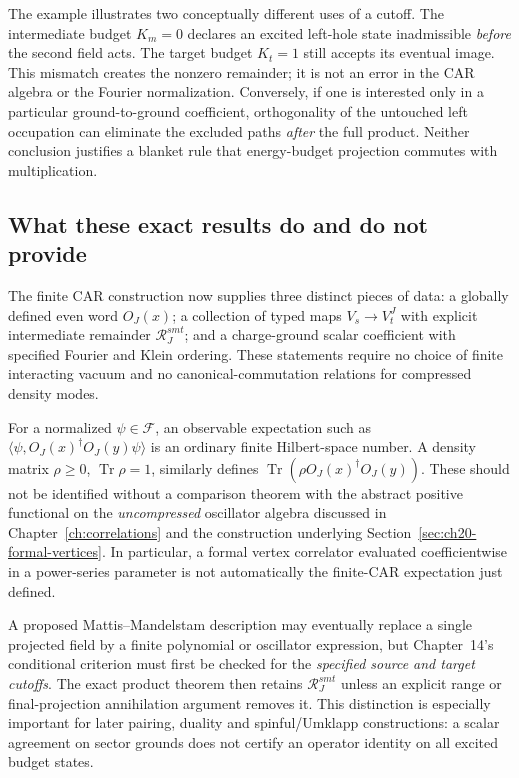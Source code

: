 The example illustrates two conceptually different uses of a cutoff.
The intermediate budget \(K_m=0\) declares an excited left-hole state
inadmissible \emph{before} the second field acts.  The target budget
\(K_t=1\) still accepts its eventual image.  This mismatch creates the
nonzero remainder; it is not an error in the CAR algebra or the Fourier
normalization.  Conversely, if one is interested only in a particular
ground-to-ground coefficient, orthogonality of the untouched left
occupation can eliminate the excluded paths \emph{after} the full
product.  Neither conclusion justifies a blanket rule that energy-budget
projection commutes with multiplication.

\subsection{What these exact results do and do not provide}
\label{subsec:ch20-scope}

The finite CAR construction now supplies three distinct pieces of data:
a globally defined even word \(O_J(x)\); a collection of typed maps
\(V_s\to V_t^J\) with explicit intermediate remainder
\(\mathcal R_J^{smt}\); and a charge-ground scalar coefficient with
specified Fourier and Klein ordering.  These statements require no
choice of finite interacting vacuum and no canonical-commutation
relations for compressed density modes.

For a normalized \(\psi\in\mathcal F\), an observable expectation such
as \(\langle\psi,O_J(x)^{\dagger}O_J(y)\psi\rangle\) is an ordinary
finite Hilbert-space number.  A density matrix \(\rho\geq0\),
\(\operatorname{Tr}\rho=1\), similarly defines
\(\operatorname{Tr}(\rho O_J(x)^{\dagger}O_J(y))\).  These should
not be identified without a comparison theorem with the abstract
positive functional on the \emph{uncompressed} oscillator algebra
discussed in Chapter~\ref{ch:correlations} and the construction
underlying Section~\ref{sec:ch20-formal-vertices}.  In particular,
a formal vertex correlator evaluated coefficientwise in a power-series
parameter is not automatically the finite-CAR expectation just defined.

A proposed Mattis--Mandelstam description may eventually replace a
single projected field by a finite polynomial or oscillator expression,
but Chapter~14's conditional criterion must first be checked for the
\emph{specified source and target cutoffs}.  The exact product theorem
then retains \(\mathcal R_J^{smt}\) unless an explicit range or
final-projection annihilation argument removes it.  This distinction is
especially important for later pairing, duality and spinful/Umklapp
constructions: a scalar agreement on sector grounds does not certify an
operator identity on all excited budget states.

